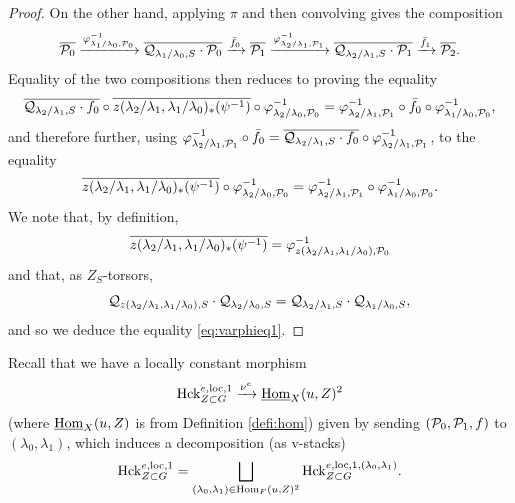 \begin{proof}
On the other hand, applying $\pi$ and then convolving gives the composition
\begin{equation*}
\overline{\mathcal{P}_{0}} \xrightarrow{\varphi_{\lambda_{1}/\lambda_{0},\mathcal{P}_{0}}^{-1}} \overline{\mathcal{Q}_{\lambda_{1}/\lambda_{0},S}\cdot \mathcal{P}_{0}}  \xrightarrow{\bar{f}_{0}} \overline{\mathcal{P}_{1}} \xrightarrow{\varphi_{\lambda_{2}/\lambda_{1},\mathcal{P}_{1}}^{-1}} 
\overline{\mathcal{Q}_{\lambda_{2}/\lambda_{1},S}\cdot \mathcal{P}_{1}}  \xrightarrow{\bar{f}_{1}} \overline{\mathcal{P}_{2}}.
\end{equation*}
Equality of the two compositions then reduces to proving the equality
\begin{equation*}
\overline{\mathcal{Q}_{\lambda_{2}/\lambda_{1},S} \cdot f_{0}} \circ  \overline{z(\lambda_{2}/\lambda_{1},\lambda_{1}/\lambda_{0})_{*}(\psi^{-1})} \circ \varphi_{\lambda_{2}/\lambda_{0},\mathcal{P}_{0}}^{-1} = \varphi_{\lambda_{2}/\lambda_{1},\mathcal{P}_{1}}^{-1} \circ \bar{f}_{0} \circ \varphi_{\lambda_{1}/\lambda_{0},\mathcal{P}_{0}}^{-1},
\end{equation*}
and therefore further, using $\varphi_{\lambda_{2}/\lambda_{1},\mathcal{P}_{1}}^{-1} \circ \bar{f}_{0} = \overline{\mathcal{Q}_{\lambda_{2}/\lambda_{1},S} \cdot f_{0}} \circ \varphi_{\lambda_{2}/\lambda_{1},\mathcal{P}_{1}}^{-1}$, to the equality 
\begin{equation}\label{eq:varphieq1}
    \overline{z(\lambda_{2}/\lambda_{1},\lambda_{1}/\lambda_{0})_{*}(\psi^{-1})} \circ \varphi_{\lambda_{2}/\lambda_{0},\mathcal{P}_{0}}^{-1} =  \varphi_{\lambda_{2}/\lambda_{1},\mathcal{P}_{1}}^{-1} \circ \varphi_{\lambda_{1}/\lambda_{0},\mathcal{P}_{0}}^{-1}.
\end{equation}
We note that, by definition,
\begin{equation*}
\overline{z(\lambda_{2}/\lambda_{1},\lambda_{1}/\lambda_{0})_{*}(\psi^{-1})} = \varphi^{-1}_{z(\lambda_{2}/\lambda_{1},\lambda_{1}/\lambda_{0}),\mathcal{P}_{0}}
\end{equation*}
and that, as $Z_{S}$-torsors,
\begin{equation*}
    \mathcal{Q}_{z(\lambda_{2}/\lambda_{1},\lambda_{1}/\lambda_{0}),S} \cdot \mathcal{Q}_{\lambda_{2}/\lambda_{0},S}= \mathcal{Q}_{\lambda_{2}/\lambda_{1},S} \cdot \mathcal{Q}_{\lambda_{1}/\lambda_{0},S} ,
\end{equation*}
and so we deduce the equality \eqref{eq:varphieq1}.
\end{proof}

Recall that we have a locally constant morphism
\begin{equation*}
    \mathrm{Hck}^{e,\mathrm{loc},1}_{Z \subset G} \xrightarrow{\nu^{e}} \underline{\mathrm{Hom}}_{X}(u,Z)^{2}
\end{equation*}
(where $\underline{\mathrm{Hom}}_{X}(u,Z)$ is from Definition \ref{defi:hom}) given by sending $(\mathcal{P}_{0}, \mathcal{P}_{1}, f)$ to $(\lambda_{0},\lambda_{1})$, which induces a decomposition (as v-stacks)
\begin{equation}\label{eq:HckeDecomp}
\mathrm{Hck}^{e,\mathrm{loc},1}_{Z \subset G} = \bigsqcup_{(\lambda_{0},\lambda_{1}) \in \mathrm{Hom}_{F}(u,Z)^{2}} \mathrm{Hck}^{e,\mathrm{loc},1,(\lambda_{0},\lambda_{1})}_{Z \subset G}.
\end{equation}

